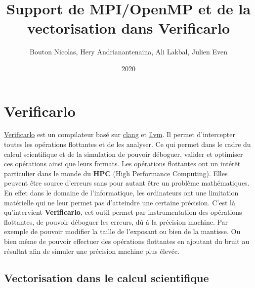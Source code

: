 \documentclass[11pt]{article}
\author{Bouton Nicolas, Hery Andrianantenaina, Ali Lakbal, Julien Even}
\date{2020}
\title{Support de MPI/OpenMP et de la vectorisation dans Verificarlo}
\begin{document}
\maketitle
\tableofcontents


\section{Verificarlo}
\label{sec:org15f48c8}

\href{https://github.com/verificarlo/verificarlo}{Verificarlo} est un compilateur basé sur \href{https://clang.llvm.org/}{clang} et \href{https://llvm.org/}{llvm}. Il
permet d'intercepter toutes les opérations flottantes et de les
analyser. Ce qui permet dans le cadre du calcul scientifique et de
la simulation de pouvoir déboguer, valider et optimiser ces
opérations ainsi que leurs formats.
\vspace{5mm}
Les opérations flottantes ont un intérêt particulier dans le monde
du \textbf{HPC} (High Performance Computing). Elles peuvent être source
d'erreurs sans pour autant être un problème mathématiques. En effet
dans le domaine de l'informatique, les ordinateurs ont une
limitation matérielle qui ne leur permet pas d'atteindre une
certaine précision.
\vspace{5mm}
C'est là qu'intervient \textbf{Verificarlo}, cet outil permet par
instrumentation des opérations flottantes, de pouvoir déboguer 
les erreurs, dû à la précision machine. Par exemple de pouvoir
modifier la taille de l'exposant ou bien de la mantisse. Ou
bien même de pouvoir effectuer des opérations flottantes en
ajoutant du bruit au résultat afin de simuler une précision machine
plus élevée.

\subsection{Vectorisation dans le calcul scientifique}
\label{sec:orge419564}
\end{document}
